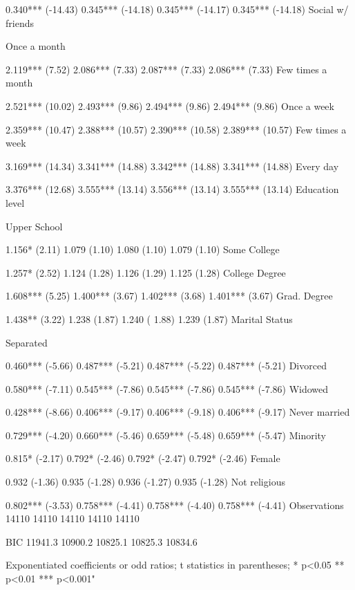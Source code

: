 0.340***
(-14.43)
0.345***
(-14.18)
0.345***
(-14.17)
0.345***
(-14.18)
Social w/ friends






Once a month


2.119*** (7.52)
2.086*** (7.33)
2.087*** (7.33)
2.086***
(7.33)
Few times a month

2.521*** (10.02)
2.493*** (9.86)
2.494*** (9.86)
2.494***
(9.86)
Once a week


2.359*** (10.47)
2.388*** (10.57)
2.390*** (10.58)
2.389*** (10.57)
Few times a week

3.169*** (14.34)
3.341*** (14.88)
3.342*** (14.88)
3.341*** (14.88)
Every day


3.376*** (12.68)
3.555*** (13.14)
3.556*** (13.14)
3.555*** (13.14)
Education level






Upper School

1.156* (2.11)
1.079
(1.10)
1.080
(1.10)
1.079
(1.10)
Some College

1.257* (2.52)
1.124 (1.28)
1.126 (1.29)
1.125
(1.28)
College Degree

1.608*** (5.25)
1.400*** (3.67)
1.402*** (3.68)
1.401***
(3.67)
Grad. Degree

1.438** (3.22)
1.238
(1.87)
1.240 (
1.88)
1.239
(1.87)
Marital Status






Separated


0.460***
(-5.66)
0.487***
(-5.21)
0.487***
(-5.22)
0.487***
(-5.21)
Divorced


0.580***
(-7.11)
0.545***
(-7.86)
0.545***
(-7.86)
0.545***
(-7.86)
Widowed


0.428***
(-8.66)
0.406***
(-9.17)
0.406***
(-9.18)
0.406***
(-9.17)
Never married


0.729***
(-4.20)
0.660***
(-5.46)
0.659***
(-5.48)
0.659***
(-5.47)
Minority


0.815*
(-2.17)
0.792*
(-2.46)
0.792*
(-2.47)
0.792*
(-2.46)
Female


0.932
(-1.36)
0.935
(-1.28)
0.936
(-1.27)
0.935
(-1.28)
Not religious


0.802***
(-3.53)
0.758***
(-4.41)
0.758***
(-4.40)
0.758***
(-4.41)
Observations
14110
14110
14110
14110
14110

BIC
11941.3
10900.2
10825.1
10825.3
10834.6

Exponentiated coefficients or odd ratios; t statistics in parentheses;
* p<0.05 ** p<0.01 *** p<0.001"

